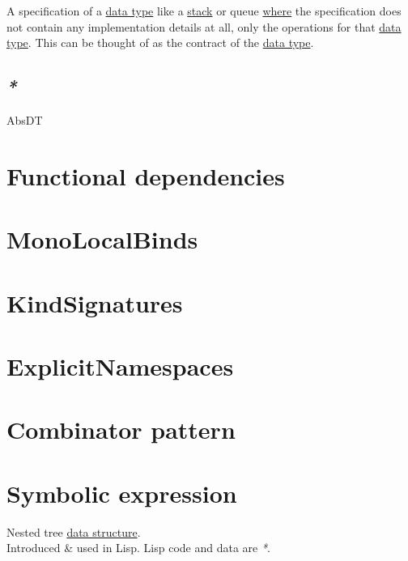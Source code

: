 \documentclass[a4paper,14pt,oneside]{book}
\begin{document}
{A specification of a \hyperref[org3de168a]{data type} like a \hyperref[org507f473]{stack} or queue \hyperref[org5b6b021]{where} the specification does not contain any implementation details at all, only the operations for that \hyperref[org3de168a]{data type}. This can be thought of as the contract of the \hyperref[org3de168a]{data type}.\\

\section{\emph{*}}
\label{sec:org8b102a0}

\label{org96c683e}AbsDT\\

\chapter{\label{org1f4d1fa}Functional dependencies}
\label{sec:org09afe19}

\chapter{\label{org6205fc7}MonoLocalBinds}
\label{sec:orgc739f33}

\chapter{\label{orga4e0349}KindSignatures}
\label{sec:org623b30e}

\chapter{\label{org909c8d3}ExplicitNamespaces}
\label{sec:org93c1875}

\chapter{\label{org44ddee6}Combinator pattern}
\label{sec:orge1b3f45}

\chapter{\label{org0e96d72}Symbolic expression}
\label{sec:org84a5d0a}
Nested tree \hyperref[orgbe03dd5]{data structure}.\\

Introduced \& used in Lisp. Lisp code and data are \emph{*}.\\

}
\end{document}
